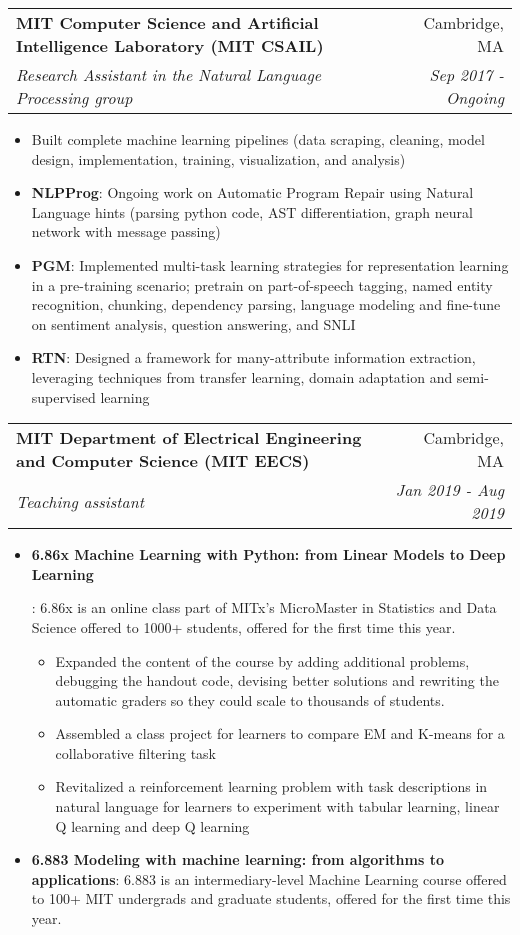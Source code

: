 \documentclass[letterpaper,10pt]{article}
\makeatletter
\newcommand{\resumeItem}[2]{
  \item\small{
    \textbf{#1}{: #2 \vspace{-2pt}}
  }
}
\newcommand{\resumeSubheading}[4]{
  \vspace{-1pt}\item[]
  \begin{tabular*}{0.98\textwidth}{l@{\extracolsep{\fill}}r}
      \hspace{-10pt}\textbf{#1} & #2 \\
      \hspace{-10pt}\textit{\small#3} & \textit{\small #4} \\
    \end{tabular*}\vspace{-5pt}
}
\newcommand{\resumeSubItem}[2]{\resumeItem{#1}{#2}\vspace{-4pt}}
\newcommand{\resumeItemListStart}{\begin{itemize}}
\newcommand{\resumeItemListEnd}{\end{itemize}\vspace{-5pt}}
\makeatother
\begin{document}
    \resumeSubheading
      {MIT Computer Science and Artificial Intelligence Laboratory (MIT CSAIL)}{Cambridge, MA}
      {Research Assistant in the Natural Language Processing group}{Sep 2017 - Ongoing}
      \resumeItemListStart
    \item \small Built complete machine learning pipelines (data scraping, cleaning, model design, implementation, training, visualization, and analysis)
      \resumeSubItem{NLPProg} {Ongoing work on  Automatic Program Repair using Natural Language hints (parsing python code, AST differentiation, graph neural network with message passing)}
      \vspace{3pt}
      \resumeSubItem{PGM} {Implemented multi-task learning strategies for representation learning in a pre-training scenario; pretrain on part-of-speech tagging, named entity recognition, chunking, dependency parsing, language modeling and fine-tune on sentiment analysis, question answering, and SNLI}
      \vspace{3pt}
        \resumeSubItem{RTN} {Designed a framework for many-attribute information extraction, leveraging techniques from transfer learning, domain adaptation and semi-supervised learning}
      \vspace{3pt}
      \resumeItemListEnd

    \resumeSubheading
      {MIT Department of Electrical Engineering and Computer Science (MIT EECS)}{Cambridge, MA}
      {Teaching assistant}{Jan 2019 - Aug 2019}
      \resumeItemListStart
        \resumeItem{6.86x Machine Learning with Python: from Linear Models to Deep Learning}
        {6.86x is an online class part of MITx's MicroMaster in Statistics and Data Science offered to 1000+ students, offered for the first time this year.
        \vspace{-5pt}
          \begin{itemize}
            \item Expanded the content of the course by adding additional problems, debugging the handout code, devising better solutions and rewriting the automatic graders so they could scale to thousands of students.
            \item Assembled a class project for learners to compare EM and K-means for a collaborative filtering task
            \item Revitalized a reinforcement learning problem with task descriptions in natural language for learners to experiment with tabular learning, linear Q learning and deep Q learning
          \end{itemize}
        }
        \resumeItem{6.883 Modeling with machine learning: from algorithms to applications}
        {
          6.883 is an intermediary-level Machine Learning course offered to 100+  MIT undergrads and graduate students, offered for the first time this year.
        }
      \resumeItemListEnd
\end{document}
